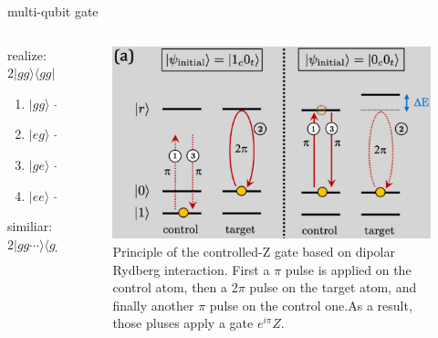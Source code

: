 \documentclass[18 pt]{beamer}
\begin{document}
\begin{frame}{multi-qubit gate}
  \begin{columns}
    \begin{column}{.5\textwidth}
      realize: \(2|gg\rangle\langle gg|-\mathbb{I} \)
      \vspace{20pt}
      \begin{enumerate}
        \item \(|gg\rangle\to |gg\rangle \to |gg\rangle \to |gg\rangle\)
        \item \(|eg\rangle\to |rg\rangle \to |rg\rangle \to -|eg\rangle \)
        \item \(|ge\rangle\to |ge\rangle \to -|ge\rangle \to -|ge\rangle \)
        \item \(|ee\rangle\to |re\rangle \to |re\rangle  \to -|ee\rangle \)
      \end{enumerate}
      \vspace{20pt}
      similiar: \(2|gg\cdots\rangle\langle gg\cdots|-\mathbb{I} \)
    \end{column}
    \begin{column}{.5\textwidth}
      \begin{figure}
        \includegraphics[width=\textwidth]{IMG/cz.png}
        \caption{Principle of the controlled-Z gate based on dipolar Rydberg interaction. First a $\pi$ pulse is applied on the control atom, then a 2$\pi$ pulse on the target atom, and finally another $\pi$ pulse on the control one.As a result, those pluses apply a gate $e^{i\pi} Z$.}
      \end{figure}
    \end{column}
  \end{columns}
\end{frame}
\end{document}
